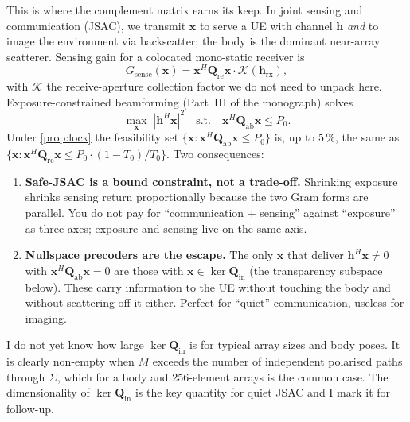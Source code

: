 \documentclass[11pt,a4paper]{article}
\theoremstyle{definition}
\newcommand{\Qabs}{\mathbf{Q}_{\mathrm{ab}}}
\newcommand{\Qref}{\mathbf{Q}_{\mathrm{re}}}
\newcommand{\Qinn}{\mathbf{Q}_{\mathrm{in}}}
\begin{document}
This is where the complement matrix earns its keep.  In joint
sensing and communication (JSAC), we transmit $\mathbf{x}$ to serve
a UE with channel $\mathbf{h}$ \emph{and} to image the environment
via backscatter; the body is the dominant near-array scatterer.
Sensing gain for a colocated mono-static receiver is
\begin{equation}\label{eq:jsac-sense}
  G_{\mathrm{sense}}(\mathbf{x})=
  \mathbf{x}^H\Qref\mathbf{x}\cdot\mathcal{K}(\mathbf{h}_{\mathrm{rx}}),
\end{equation}
with $\mathcal{K}$ the receive-aperture collection factor we do not
need to unpack here.  Exposure-constrained beamforming (Part~III of the monograph) solves
\begin{equation}\label{eq:ecbf-orig}
  \max_{\mathbf{x}}\;|\mathbf{h}^H\mathbf{x}|^2
  \quad\text{s.t.}\quad \mathbf{x}^H\Qabs\mathbf{x}\le P_0.
\end{equation}
Under \cref{prop:lock} the feasibility set
$\{\mathbf{x}:\mathbf{x}^H\Qabs\mathbf{x}\le P_0\}$ is, up to
$5\,\%$, the same as
$\{\mathbf{x}:\mathbf{x}^H\Qref\mathbf{x}\le P_0\cdot(1-T_0)/T_0\}$.
Two consequences:

\begin{enumerate}[leftmargin=1.6em,itemsep=2pt]
\item \textbf{Safe-JSAC is a bound constraint, not a trade-off.}
      Shrinking exposure shrinks sensing return proportionally
      because the two Gram forms are parallel.  You do not pay for
      ``communication + sensing'' against ``exposure'' as three
      axes; exposure and sensing live on the same axis.
\item \textbf{Nullspace precoders are the escape.}  The only
      $\mathbf{x}$ that deliver $\mathbf{h}^H\mathbf{x}\ne 0$ with
      $\mathbf{x}^H\Qabs\mathbf{x}=0$ are those with
      $\mathbf{x}\in\ker\Qinn$ (the transparency subspace below).
      These carry information to the UE without touching the body
      and without scattering off it either.  Perfect for ``quiet''
      communication, useless for imaging.
\end{enumerate}

I do not yet know how large $\ker\Qinn$ is for typical array sizes
and body poses.  It is clearly non-empty when $M$ exceeds the number
of independent polarised paths through $\Sigma$, which for a body
and 256-element arrays is the common case.  The dimensionality of
$\ker\Qinn$ is the key quantity for quiet JSAC and I mark it for
follow-up.

\end{document}
